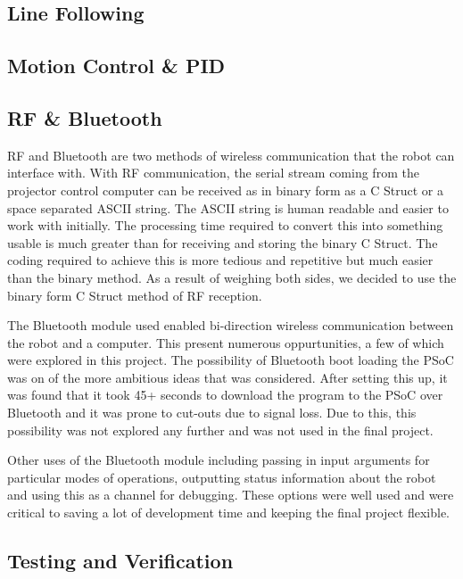 \documentclass{article}
\begin{document}
\subsection{Line Following}

\subsection{Motion Control \& PID}

\subsection{RF \& Bluetooth}

RF and Bluetooth are two methods of wireless communication that the robot can interface with. With RF communication, the serial stream coming from the projector control computer can be received as in binary form as a C Struct or a space separated ASCII string. The ASCII string is human readable and easier to work with initially. The processing time required to convert this into something usable is much greater than for receiving and storing the binary C Struct. The coding required to achieve this is more tedious and repetitive but much easier than the binary method. As a result of weighing both sides, we decided to use the binary form C Struct method of RF reception.

The Bluetooth module used enabled bi-direction wireless communication between the robot and a computer. This present numerous oppurtunities, a few of which were explored in this project. The possibility of Bluetooth boot loading the PSoC was on of the more ambitious ideas that was considered. After setting this up, it was found that it took 45+ seconds to download the program to the PSoC over Bluetooth and it was prone to cut-outs due to signal loss. Due to this, this possibility was not explored any further and was not used in the final project.

Other uses of the Bluetooth module including passing in input arguments for particular modes of operations, outputting status information about the robot and using this as a channel for debugging. These options were well used and were critical to saving a lot of development time and keeping the final project flexible.

\subsection{Testing and Verification}
\end{document}
